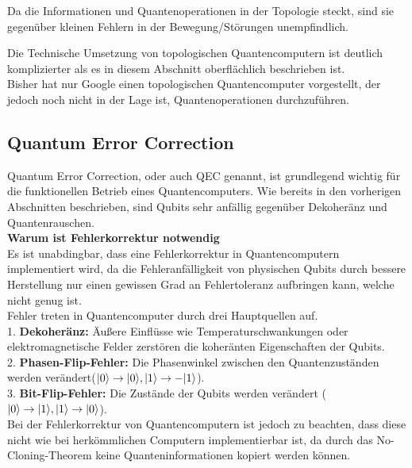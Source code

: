 Da die Informationen und Quantenoperationen in der Topologie steckt, sind sie gegenüber kleinen Fehlern in der Bewegung/Störungen unempfindlich.\\

\begin{tcolorbox}[title=Kommentar,
    title filled=false,
    colback=cyan!5!white,
    colframe=cyan!75!black]
    Die Technische Umsetzung von topologischen Quantencomputern ist deutlich komplizierter als es in diesem Abschnitt oberflächlich beschrieben ist.\\
    Bisher hat nur Google einen topologischen Quantencomputer vorgestellt, der jedoch noch nicht in der Lage ist, Quantenoperationen durchzuführen.
\end{tcolorbox}

\subsection{Quantum Error Correction}
\label{sub:quantum_error_correction}
Quantum Error Correction, oder auch QEC genannt, ist grundlegend wichtig für die funktionellen Betrieb eines Quantencomputers. Wie bereits in den vorherigen Abschnitten beschrieben,
sind Qubits sehr anfällig gegenüber Dekoheränz und Quantenrauschen.\\

\textbf{Warum ist Fehlerkorrektur notwendig}\\
Es ist unabdingbar, dass eine Fehlerkorrektur in Quantencomputern implementiert wird, da die Fehleranfälligkeit von physischen Qubits durch bessere Herstellung nur einen gewissen Grad an Fehlertoleranz aufbringen kann, welche nicht genug ist.\\

Fehler treten in Quantencomputer durch drei Hauptquellen auf.\\
1. \textbf{Dekoheränz:} Äußere Einflüsse wie Temperaturschwankungen oder elektromagnetische Felder zerstören die koheränten Eigenschaften der Qubits.\\
2. \textbf{Phasen-Flip-Fehler:} Die Phasenwinkel zwischen den Quantenzuständen werden verändert($\lvert0\rangle\rightarrow\lvert0\rangle,\lvert1\rangle\rightarrow-\lvert1\rangle$).\\ 
3. \textbf{Bit-Flip-Fehler:} Die Zustände der Qubits werden verändert ($\lvert0\rangle\rightarrow\lvert1\rangle,\lvert1\rangle\rightarrow\lvert0\rangle$).\\

Bei der Fehlerkorrektur von Quantencomputern ist jedoch zu beachten, dass diese nicht wie bei herkömmlichen Computern implementierbar ist, da durch das No-Cloning-Theorem keine Quanteninformationen kopiert werden können.\\

